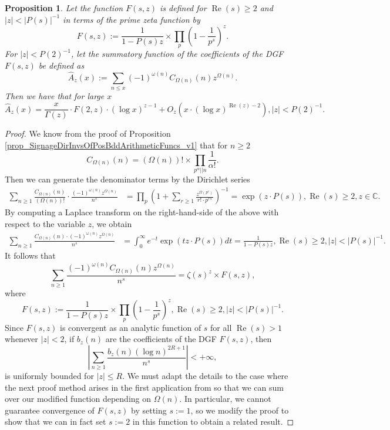\documentclass[11pt,reqno,a4letter]{article}
\numberwithin{figure}{section}
\numberwithin{table}{section}
\theoremstyle{plain}
\newtheorem{prop}[theorem]{Proposition}
\numberwithin{theorem}{section}
\theoremstyle{definition}
\renewcommand{\Re}{\operatorname{Re}}
\begin{document}
\begin{prop} 
\label{prop_HatAzx_ModSummatoryFuncExps_RelatedToCkn} 
Let the function $F(s, z)$ is defined for $\Re(s) \geq 2$ and $|z| < |P(s)|^{-1}$ 
in terms of the prime zeta function by 
\[
F(s, z) := \frac{1}{1-P(s) z} 
     \times \prod_p \left(1 - \frac{1}{p^s}\right)^{z}. 
\]
For $|z| < P(2)^{-1}$, let the summatory function of the coefficients of the 
DGF $F(s, z)$ be defined as 
\[
\widehat{A}_z(x) := \sum_{n \leq x} (-1)^{\omega(n)} 
     C_{\Omega(n)}(n) z^{\Omega(n)}. 
\]
Then we have that for large $x$ 
\[
\widehat{A}_z(x) = \frac{x}{\Gamma(z)} \cdot F(2, z) \cdot (\log x)^{z-1} + 
     O_{z}\left(x \cdot (\log x)^{\Re(z) - 2}\right), |z| < P(2)^{-1}. 
\]
\end{prop} 
\begin{proof} 
We know from the proof of 
Proposition \ref{prop_SignageDirInvsOfPosBddArithmeticFuncs_v1} that for $n \geq 2$ 
\[
C_{\Omega(n)}(n) = (\Omega(n))! \times \prod_{p^{\alpha}||n} \frac{1}{\alpha!}. 
\]
Then we can generate the denominator terms by the Dirichlet series 
\begin{align*} 
\sum_{n \geq 1} \frac{C_{\Omega(n)}(n)}{(\Omega(n))!} \cdot 
     \frac{(-1)^{\omega(n)} z^{\Omega(n)}}{n^s} & = \prod_p \left(1 + \sum_{r \geq 1} 
     \frac{z^{\Omega(p^r)}}{r! \cdot p^{rs}}\right)^{-1} 
     = \exp\left(z \cdot P(s)\right), \Re(s) \geq 2, z \in \mathbb{C}. 
\end{align*} 
By computing a Laplace transform on the right-hand-side of the above with 
respect to the variable $z$, we obtain 
\begin{align*} 
\sum_{n \geq 1} \frac{C_{\Omega(n)}(n) \cdot (-1)^{\omega(n)} z^{\Omega(n)}}{n^s} & = 
     \int_0^{\infty} e^{-t} \exp\left(tz \cdot P(s)\right) dt = \frac{1}{1 - P(s) z}, 
     \Re(s) \geq 2, |z| < |P(s)|^{-1}. 
\end{align*} 
It follows that 
\[
\sum_{n \geq 1} \frac{(-1)^{\omega(n)} C_{\Omega(n)}(n) z^{\Omega(n)}}{n^s} = 
     \zeta(s)^z \times F(s, z), 
\]
where 
\[
F(s, z) := \frac{1}{1-P(s) z} \times \prod_p \left(1 - \frac{1}{p^s}\right)^{z}, 
     \Re(s) \geq 2, |z| < |P(s)|^{-1}. 
\]
Since $F(s, z)$ is convergent as an analytic function of $s$ for all $\Re(s) > 1$ 
whenever $|z| < 2$, 
if $b_z(n)$ are the coefficients of the DGF $F(s, z)$, then 
\[
\left\lvert \sum_{n \geq 1} \frac{b_z(n) (\log n)^{2R+1}}{n^s} \right\rvert < +\infty, 
\]
is uniformly bounded for $|z| \leq R$. 
We must adapt the details to the case where the next proof method arises in the first 
application from \cite[\S 7.4; Thm.\ 7.18]{MV} 
so that we can sum over our modified function depending on $\Omega(n)$. 
In particular, we cannot guarantee convergence of $F(s, z)$ by setting $s := 1$, 
so we modify the proof to show that we can in fact set $s := 2$ in this function 
to obtain a related result. 


\end{proof}
\end{document}
